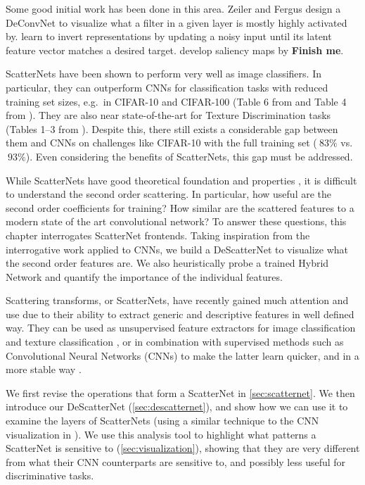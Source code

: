 Some good initial work has been done in this area. 
Zeiler and Fergus \cite{zeiler_visualizing_2014} 
design a DeConvNet to visualize what a filter in a given layer is mostly highly
activated by. \cite{mahendran_understanding_2015} learn to invert
representations by updating a noisy input until its latent feature vector
matches a desired target. \cite{simonyan_deep_2014} develop saliency maps by
\textbf{Finish me}.

ScatterNets have been shown to perform very well as image classifiers. In
particular, they can outperform CNNs for classification tasks with reduced
training set sizes, e.g.\ in CIFAR-10 and CIFAR-100 (Table 6 from
\cite{oyallon_scaling_2017} and Table 4 from \cite{singh_dual-tree_2017}).  
They are also near state-of-the-art for Texture Discrimination tasks
(Tables 1--3 from \cite{sifre_rotation_2013}). Despite this, there still exists
a considerable gap between them and CNNs on challenges like CIFAR-10 with the
full training set ($~83\%$ vs.\ $~93\%$). Even considering the benefits of
ScatterNets, this gap must be addressed.

While ScatterNets have good theoretical foundation and properties
\cite{mallat_group_2012}, it is difficult to understand the second order
scattering. In particular, how useful are the second order coefficients for
training? How similar are the scattered features to a modern state of the art
convolutional network? To answer these questions, this chapter interrogates
ScatterNet frontends. Taking inspiration from the interrogative work applied to
CNNs, we build a DeScatterNet to visualize what the second order features are.
We also heuristically probe a trained Hybrid Network and quantify the importance
of the individual features.

Scattering transforms, or ScatterNets, have recently gained much attention and
use due to their ability to extract generic and descriptive features in well
defined way. They can be used as unsupervised feature extractors
for image classification \cite{bruna_invariant_2013, oyallon_deep_2015, 
singh_dual-tree_2017, singh_multi-resolution_2016} and texture classification
\cite{sifre_rotation_2013}, or in combination with supervised methods such as
Convolutional Neural Networks (CNNs) to make the latter learn quicker, and in
a more stable way \cite{oyallon_scaling_2017}. 


We first revise the operations that form a ScatterNet in
\autoref{sec:scatternet}. We then introduce our DeScatterNet
(\autoref{sec:descatternet}), and show how we can use it to examine the layers of ScatterNets
(using a similar technique to the CNN visualization in
\cite{zeiler_visualizing_2014}). We use this analysis tool to
highlight what patterns a ScatterNet is sensitive to
(\autoref{sec:visualization}), showing that they are very
different from what their CNN counterparts are sensitive to, and possibly less
useful for discriminative tasks. 

